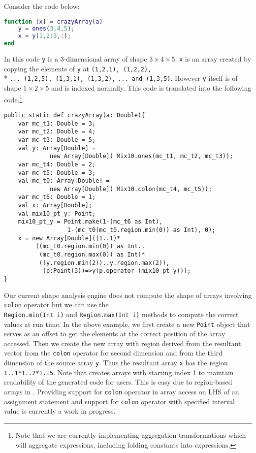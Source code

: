 Consider the \matlab code below:

\begin{lstlisting}[language=Matlab,numbers=none]
function [x] = crazyArray(a)
    y = ones(3,4,5);
    x = y(1,2:3,:);
end 
\end{lstlisting}

In this code \verb|y| is a 3-dimensional array of shape $3\times4\times5$.
\verb|x| is an array created by copying the elements of \verb|y| at 
\verb|(1,2,1), (1,2,2), |\\*
\verb|... (1,2,5), (1,3,1), (1,3,2),| 
\verb|... and (1,3,5)|. However \verb|y| itself is of shape $1\times2\times5$ and is indexed normally.
This code is translated into the following \xten code.\footnote{Note
that we are currently implementing aggregation transformations which
will aggregate expressions, including folding constants into
expressions.}

\begin{lstlisting}[language=X10,numbers=none]
public static def crazyArray(a: Double){
    var mc_t1: Double = 3;
    var mc_t2: Double = 4;
    var mc_t3: Double = 5;
    val y: Array[Double] = 
             new Array[Double]( Mix10.ones(mc_t1, mc_t2, mc_t3));
    var mc_t4: Double = 2;
    var mc_t5: Double = 3;
    val mc_t0: Array[Double] = 
             new Array[Double]( Mix10.colon(mc_t4, mc_t5));
    var mc_t6: Double = 1;
    val x: Array[Double];
    val mix10_pt_y: Point;
    mix10_pt_y = Point.make(1-(mc_t6 as Int), 
                  1-(mc_t0(mc_t0.region.min(0)) as Int), 0);
    x = new Array[Double]((1..1)*
         ((mc_t0.region.min(0)) as Int..
          (mc_t0.region.max(0)) as Int)*
          ((y.region.min(2))..y.region.max(2)),
           (p:Point(3))=>y(p.operator-(mix10_pt_y))); 
}
\end{lstlisting}

Our current shape analysis engine does not compute the shape of arrays
involving \verb|colon| operator but we can use the \\ \verb|Region.min(Int i)| 
and \verb|Region.max(Int i)| methods to compute the correct values
at run time. In the above example, we first create a new \verb|Point|
object that serves as an offset to get the elements at the correct
position of the array accessed. Then we create the new array with region
derived from the resultant vector from the \verb|colon| operator for
second dimension and from the third dimension of the source array
\verb|y|. Thus the resultant array \verb|x| has the region
\verb|1..1*1..2*1..5|. Note that \mixten creates arrays with
starting index 1 to maintain readability of the generated code for
\matlab users. This is easy due to region-based arrays in \xten.
Providing support for \verb|colon| operator in array access on LHS of an
assignment statement and support for \verb|colon| operator with
specified interval value is currently a work in progress.
   
